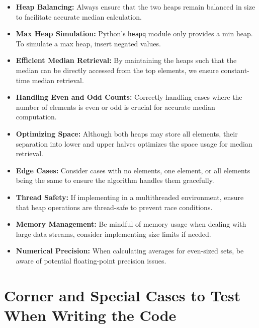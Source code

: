 \begin{itemize}
    \item \textbf{Heap Balancing:} Always ensure that the two heaps remain balanced in size to facilitate accurate median calculation.
    
    \item \textbf{Max Heap Simulation:} Python's \texttt{heapq} module only provides a min heap. To simulate a max heap, insert negated values.
    
    \item \textbf{Efficient Median Retrieval:} By maintaining the heaps such that the median can be directly accessed from the top elements, we ensure constant-time median retrieval.
    
    \item \textbf{Handling Even and Odd Counts:} Correctly handling cases where the number of elements is even or odd is crucial for accurate median computation.
    
    \item \textbf{Optimizing Space:} Although both heaps may store all elements, their separation into lower and upper halves optimizes the space usage for median retrieval.
    
    \item \textbf{Edge Cases:} Consider cases with no elements, one element, or all elements being the same to ensure the algorithm handles them gracefully.
    
    \item \textbf{Thread Safety:} If implementing in a multithreaded environment, ensure that heap operations are thread-safe to prevent race conditions.
    
    \item \textbf{Memory Management:} Be mindful of memory usage when dealing with large data streams, consider implementing size limits if needed.
    
    \item \textbf{Numerical Precision:} When calculating averages for even-sized sets, be aware of potential floating-point precision issues.
\end{itemize}

\section*{Corner and Special Cases to Test When Writing the Code}


